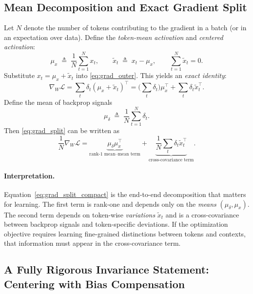 \subsection{Mean Decomposition and Exact Gradient Split}

Let $N$ denote the number of tokens contributing to the gradient in a batch (or in an expectation over data).
Define the \emph{token-mean activation} and \emph{centered activation}:
\begin{equation}
\label{eq:mean_center_def}
\mu_x \;\triangleq\; \frac{1}{N}\sum_{t=1}^N x_t,
\qquad
\tilde{x}_t \;\triangleq\; x_t - \mu_x,
\qquad
\sum_{t=1}^N \tilde{x}_t = 0.
\end{equation}
Substitute $x_t=\mu_x+\tilde{x}_t$ into \eqref{eq:grad_outer}. This yields an \emph{exact identity}:
\begin{equation}
\label{eq:grad_split}
\nabla_W \mathcal{L}
=
\sum_t \delta_t(\mu_x+\tilde{x}_t)^\top
=
\Big(\sum_t \delta_t\Big)\mu_x^\top
+
\sum_t \delta_t \tilde{x}_t^\top.
\end{equation}
Define the mean of backprop signals
\begin{equation}
\label{eq:mu_delta_def}
\mu_\delta \;\triangleq\; \frac{1}{N}\sum_{t=1}^N \delta_t.
\end{equation}
Then \eqref{eq:grad_split} can be written as
\begin{equation}
\label{eq:grad_split_compact}
\frac{1}{N}\nabla_W \mathcal{L}
=
\underbrace{\mu_\delta \mu_x^\top}_{\text{rank-1 mean--mean term}}
+
\underbrace{\frac{1}{N}\sum_t \delta_t\tilde{x}_t^\top}_{\text{cross-covariance term}}.
\end{equation}

\paragraph{Interpretation.}
Equation~\eqref{eq:grad_split_compact} is the end-to-end decomposition that matters for learning.
The first term is rank-one and depends only on the \emph{means} $(\mu_\delta,\mu_x)$.
The second term depends on token-wise \emph{variations} $\tilde{x}_t$ and is a cross-covariance between
backprop signals and token-specific deviations.
If the optimization objective requires learning fine-grained distinctions between tokens and contexts, that information must appear in the cross-covariance term.

\subsection{A Fully Rigorous Invariance Statement: Centering with Bias Compensation}


